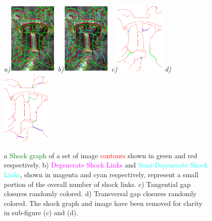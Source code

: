 \begin{figure}[ht]
\centering
{\footnotesize\textit{a)}}\includegraphics[width=0.22\textwidth]{figs/176019_00_shocks.pdf}
{\footnotesize\textit{b)}}\includegraphics[width=0.22\textwidth]{figs/176019_00_labeled_shocks.pdf}
{\footnotesize\textit{c)}}\includegraphics[width=0.22\textwidth]{figs/176019_00_gap1s.pdf}
{\footnotesize\textit{d)}}\includegraphics[width=0.22\textwidth]{figs/176019_00_gap4s.pdf}
\caption{a \textcolor{green}{Shock graph} of a set of image \textcolor{red}{contours} shown in green and red respectively. b) \textcolor{magenta}{Degenerate Shock Links} and \textcolor{cyan}{Semi-Degenerate Shock Links}, shown in magenta and cyan respectively, represent a small portion of the overall number of shock links. c) Tangential gap closures randomly colored. d) Transversal gap closures randomly colored. The shock graph and image have been removed for clarity in sub-figure (c) and (d).}
\label{fig:gap_detect}
\end{figure}

